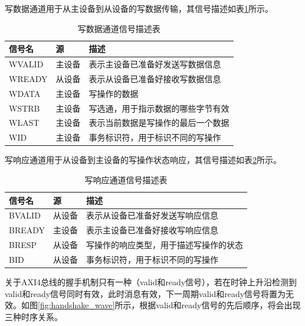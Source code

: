 写数据通道用于从主设备到从设备的写数据传输，其信号描述如表\ref{tab:write_data_bus}所示。

\begin{table}[H]
	\centering
	\caption{写数据通道信号描述表}
	\begin{tabularx}{\textwidth}{>{\centering\arraybackslash}p{4cm} >{\centering\arraybackslash}p{3cm} >{\centering\arraybackslash}X}
		\toprule
		\textbf{信号名} & \textbf{源} & \textbf{描述}       \\
		\midrule
		WVALID       & 主设备        & 表示主设备已准备好发送写数据信息  \\
		WREADY       & 从设备        & 表示从设备已准备好接收写数据信息  \\
		WDATA        & 主设备        & 写操作的数据            \\
		WSTRB        & 主设备        & 写选通，用于指示数据的哪些字节有效 \\
		WLAST        & 主设备        & 表示当前数据是写操作的最后一个数据 \\
		WID          & 主设备        & 事务标识符，用于标识不同的写操作  \\
		\bottomrule
	\end{tabularx}
	\label{tab:write_data_bus}
\end{table}

写响应通道用于从设备到主设备的写操作状态响应，其信号描述如表\ref{tab:write_response_bus}所示。

\begin{table}[H]
	\centering
	\caption{写响应通道信号描述表}
	\begin{tabularx}{\textwidth}{>{\centering\arraybackslash}p{4cm} >{\centering\arraybackslash}p{3cm} >{\centering\arraybackslash}X}
		\toprule
		\textbf{信号名} & \textbf{源} & \textbf{描述}         \\
		\midrule
		BVALID       & 从设备        & 表示从设备已准备好发送写响应信息    \\
		BREADY       & 主设备        & 表示主设备已准备好接收写响应信息    \\
		BRESP        & 从设备        & 写操作的响应类型，用于描述写操作的状态 \\
		BID          & 从设备        & 事务标识符，用于标识不同的写操作    \\
		\bottomrule
	\end{tabularx}
	\label{tab:write_response_bus}
\end{table}

关于AXI4总线的握手机制只有一种（valid和ready信号），若在时钟上升沿检测到valid和ready信号同时有效，此时消息有效，下一周期valid和ready信号将置为无效。如图\ref{fig:handshake_wave}所示，根据valid和ready信号的先后顺序，将会出现三种时序关系。

